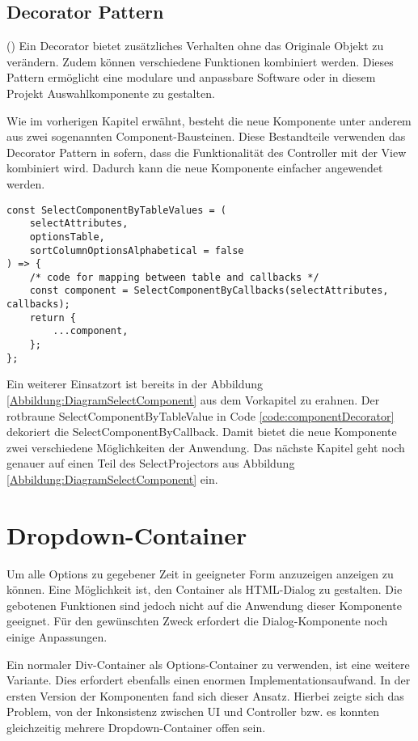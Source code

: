 \subsection{Decorator Pattern}

(\cite{decoratorPattern}) Ein Decorator bietet zusätzliches Verhalten ohne das Originale Objekt zu verändern.
Zudem können verschiedene Funktionen kombiniert werden.
Dieses Pattern ermöglicht eine modulare und anpassbare Software oder in diesem Projekt Auswahlkomponente zu gestalten.

Wie im vorherigen Kapitel erwähnt, besteht die neue Komponente unter anderem aus zwei sogenannten Component-Bausteinen.
Diese Bestandteile verwenden das Decorator Pattern in sofern, dass die Funktionalität des Controller mit der View kombiniert wird.
Dadurch kann die neue Komponente einfacher angewendet werden.

\begin{lstlisting}[style = htmlcssjs, caption = SelectComponentByTableValue dekoriert SelectComponentByCallback, label = code:componentDecorator]
const SelectComponentByTableValues = (
    selectAttributes,
    optionsTable,
    sortColumnOptionsAlphabetical = false
) => {
    /* code for mapping between table and callbacks */
    const component = SelectComponentByCallbacks(selectAttributes, callbacks);
    return {
        ...component,
    };
};
\end{lstlisting}

Ein weiterer Einsatzort ist bereits in der Abbildung \ref{Abbildung:DiagramSelectComponent} aus dem Vorkapitel zu erahnen.
Der rotbraune SelectComponentByTableValue in Code \ref{code:componentDecorator} dekoriert die SelectComponentByCallback.
Damit bietet die neue Komponente zwei verschiedene Möglichkeiten der Anwendung.
Das nächste Kapitel geht noch genauer auf einen Teil des SelectProjectors aus Abbildung \ref{Abbildung:DiagramSelectComponent} ein.


\section{Dropdown-Container}

Um alle Options zu gegebener Zeit in geeigneter Form anzuzeigen anzeigen zu können.
Eine Möglichkeit ist, den Container als HTML-Dialog zu gestalten.
Die gebotenen Funktionen sind jedoch nicht auf die Anwendung dieser Komponente geeignet.
Für den gewünschten Zweck erfordert die Dialog-Komponente noch einige Anpassungen.

Ein normaler Div-Container als Options-Container zu verwenden, ist eine weitere Variante.
Dies erfordert ebenfalls einen enormen Implementationsaufwand.
In der ersten Version der Komponenten fand sich dieser Ansatz.
Hierbei zeigte sich das Problem, von der Inkonsistenz zwischen UI und Controller bzw. es konnten gleichzeitig mehrere Dropdown-Container offen sein.

